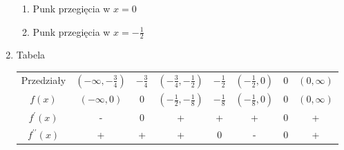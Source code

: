 \documentclass[11pt]{scrartcl}
\begin{document}
\begin{enumerate}
\begin{enumerate}
	\item Punk przegięcia w $ x = 0 $
  \item Punk przegięcia w $ x = -\frac{1}{2} $
	\end{enumerate}
\item Tabela \\
	\begin{center}
		\begin{tabular}{ |c|c|c|c|c|c|c|c| }
			\hline
			Przedziały &
			$ (-\infty, -\frac{3}{4}) $ &
			$ -\frac{3}{4} $ &
			$ (-\frac{3}{4}, -\frac{1}{2}) $ &
			$ -\frac{1}{2} $ &
			$ (-\frac{1}{2} ,0) $ &
			$ 0 $ &
      $ (0, \infty) $ \\
			$ f(x) $ &
			$ (-\infty, 0) $ &
			$ 0 $ &
			$ (- \frac{1}{2}, - \frac{1}{8}) $ &
			$ - \frac{1}{8} $ &
			$ (- \frac{1}{8}, 0 ) $ &
			$ 0 $ &
      $ (0, \infty )$\\
			$ f^{\prime}(x) $ &
			- &
			0 &
			+ &
			+ &
			+ &
			0 &
      + \\
			$ f^{\prime\prime}(x) $ &
			+ &
			+ &
			+ &
			0 &
			- &
			0 &
      + \\
			\hline
		\end{tabular}
	\end{center}
\end{enumerate}

\begin{center}
\end{center}
\end{document}
